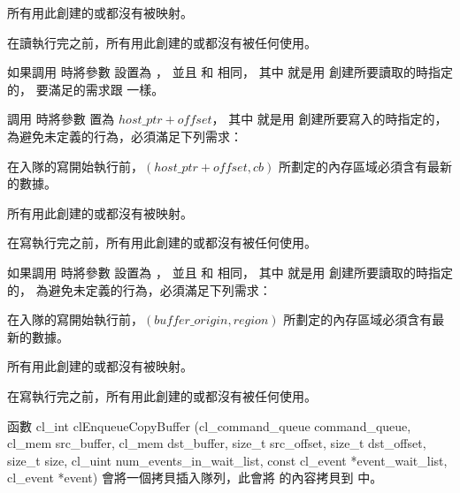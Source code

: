 \item 所有用此創建的或都沒有被映射。

\item 在讀執行完之前，所有用此創建的或都沒有被任何使用。
\stopigBase

如果調用  時將參數  設置為 ，
並且  和  相同，
其中  就是用  創建所要讀取的時指定的，
要滿足的需求跟  一樣。

調用  時將參數  置為 $host\_ptr + offset$，
其中  就是用  創建所要寫入的時指定的，
為避免未定義的行為，必須滿足下列需求：
\startigBase
\item 在入隊的寫開始執行前，$(host\_ptr + offset, cb)$ 所劃定的內存區域必須含有最新的數據。

\item 所有用此創建的或都沒有被映射。

\item 在寫執行完之前，所有用此創建的或都沒有被任何使用。
\stopigBase

如果調用  時將參數  設置為 ，
並且  和  相同，
其中  就是用  創建所要讀取的時指定的，
為避免未定義的行為，必須滿足下列需求：
\startigBase
\item 在入隊的寫開始執行前，$(buffer\_origin, region)$ 所劃定的內存區域必須含有最新的數據。

\item 所有用此創建的或都沒有被映射。

\item 在寫執行完之前，所有用此創建的或都沒有被任何使用。
\stopigBase

函數
\startclc
cl_int clEnqueueCopyBuffer (cl_command_queue command_queue,
			cl_mem src_buffer,
			cl_mem dst_buffer,
			size_t src_offset,
			size_t dst_offset,
			size_t size,
			cl_uint num_events_in_wait_list,
			const cl_event *event_wait_list,
			cl_event *event)
\stopclc
會將一個拷貝插入隊列，此會將  的內容拷貝到  中。

